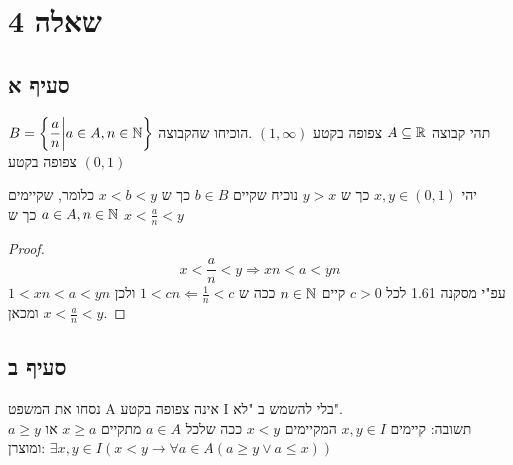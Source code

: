\documentclass{article}
\begin{document}
	\section*{שאלה 4}
	\subsection*{סעיף א}
	תהי קבוצה $A \subseteq \mathbb{R}$ צפופה בקטע $(1, \infty)$ .הוכיחו שהקבוצה
	 $B = \bigg\{ \dfrac{a}{n} \bigg| a \in A, n \in \mathbb{N} \bigg\}$
	 צפופה בקטע $(0,1)$

	 יהי $x,y \in (0,1)$ כך ש $y > x$ נוכיח שקיים $b \in B$ כך ש $x < b < y$ כלומר, שקיימים $a \in A, n \in \mathbb{N}$ כך ש $x < \frac{a}{n} < y$
	 \begin{proof}
	 	\[
	 		x < \frac{a}{n} < y \Rightarrow
	 		xn < a < yn
	 	 \]
	 	 עפ"י מסקנה 1.61 לכל $c > 0$ קיים $n \in \mathbb{N}$ ככה ש
	 	 $1 < cn \Leftarrow \frac{1}{n} < c$
	 	 ולכן $1 < xn < a < yn$ ומכאן $x < \frac{a}{n} < y$.
	 \end{proof}

 	\subsection*{סעיף ב}
 	נסחו את המשפט A אינה צפופה בקטע I בלי להשמש ב "לא". \\
 	תשובה:
 	קיימים $x,y \in I$ המקיימים $x < y$ ככה שלכל $a \in A$ מתקיים $x \geq a$ או $a \geq y$
 	ומוצרן:
 	$\exists x,y \in I(x< y \rightarrow \forall a \in A (a \geq y \lor a \leq x))$
\end{document}
